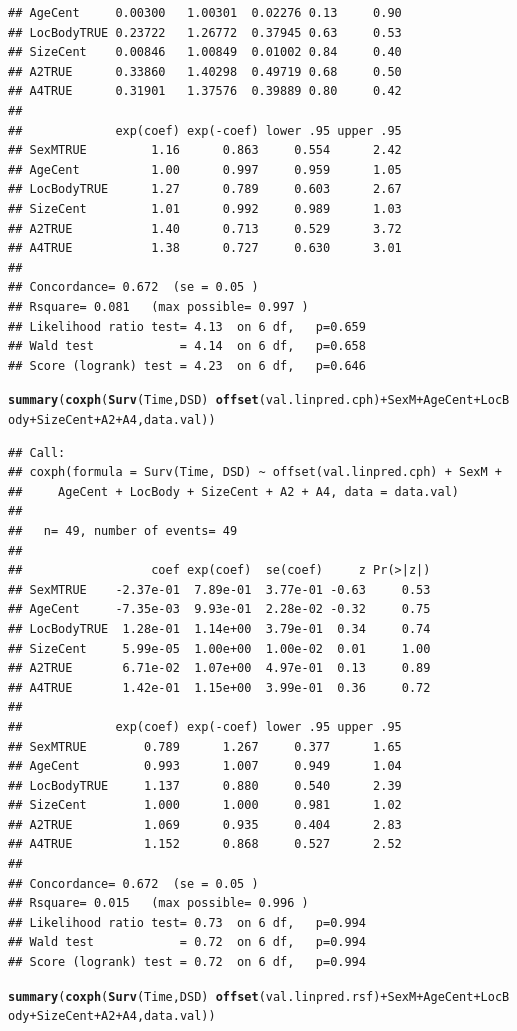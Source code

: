 \documentclass{article}\usepackage[]{graphicx}\usepackage[]{color}
\makeatletter
\newcommand{\hlopt}[1]{\textcolor[rgb]{0,0,0}{#1}}%
\newcommand{\hlstd}[1]{\textcolor[rgb]{0.345,0.345,0.345}{#1}}%
\newcommand{\hlkwd}[1]{\textcolor[rgb]{0.737,0.353,0.396}{\textbf{#1}}}%
\newenvironment{kframe}{%
 \def\at@end@of@kframe{}%
 \ifinner\ifhmode%
  \def\at@end@of@kframe{\end{minipage}}%
  \begin{minipage}{\columnwidth}%
 \fi\fi%
 \def\FrameCommand##1{\hskip\@totalleftmargin \hskip-\fboxsep
 \colorbox{shadecolor}{##1}\hskip-\fboxsep
     \hskip-\linewidth \hskip-\@totalleftmargin \hskip\columnwidth}%
 \MakeFramed {\advance\hsize-\width
   \@totalleftmargin\z@ \linewidth\hsize
   \@setminipage}}%
 {\par\unskip\endMakeFramed%
 \at@end@of@kframe}
\newenvironment{knitrout}{}{} %
\makeatother
\begin{document}
\begin{knitrout}
\begin{kframe}
\begin{verbatim}
## AgeCent     0.00300   1.00301  0.02276 0.13     0.90
## LocBodyTRUE 0.23722   1.26772  0.37945 0.63     0.53
## SizeCent    0.00846   1.00849  0.01002 0.84     0.40
## A2TRUE      0.33860   1.40298  0.49719 0.68     0.50
## A4TRUE      0.31901   1.37576  0.39889 0.80     0.42
## 
##             exp(coef) exp(-coef) lower .95 upper .95
## SexMTRUE         1.16      0.863     0.554      2.42
## AgeCent          1.00      0.997     0.959      1.05
## LocBodyTRUE      1.27      0.789     0.603      2.67
## SizeCent         1.01      0.992     0.989      1.03
## A2TRUE           1.40      0.713     0.529      3.72
## A4TRUE           1.38      0.727     0.630      3.01
## 
## Concordance= 0.672  (se = 0.05 )
## Rsquare= 0.081   (max possible= 0.997 )
## Likelihood ratio test= 4.13  on 6 df,   p=0.659
## Wald test            = 4.14  on 6 df,   p=0.658
## Score (logrank) test = 4.23  on 6 df,   p=0.646
\end{verbatim}
\begin{alltt}
\hlkwd{summary}\hlstd{(}\hlkwd{coxph}\hlstd{(}\hlkwd{Surv}\hlstd{(Time, DSD)} \hlopt{~} \hlkwd{offset}\hlstd{(val.linpred.cph)} \hlopt{+} \hlstd{SexM} \hlopt{+} \hlstd{AgeCent} \hlopt{+} \hlstd{LocBody} \hlopt{+} \hlstd{SizeCent} \hlopt{+} \hlstd{A2} \hlopt{+} \hlstd{A4, data.val))}
\end{alltt}
\begin{verbatim}
## Call:
## coxph(formula = Surv(Time, DSD) ~ offset(val.linpred.cph) + SexM + 
##     AgeCent + LocBody + SizeCent + A2 + A4, data = data.val)
## 
##   n= 49, number of events= 49 
## 
##                  coef exp(coef)  se(coef)     z Pr(>|z|)
## SexMTRUE    -2.37e-01  7.89e-01  3.77e-01 -0.63     0.53
## AgeCent     -7.35e-03  9.93e-01  2.28e-02 -0.32     0.75
## LocBodyTRUE  1.28e-01  1.14e+00  3.79e-01  0.34     0.74
## SizeCent     5.99e-05  1.00e+00  1.00e-02  0.01     1.00
## A2TRUE       6.71e-02  1.07e+00  4.97e-01  0.13     0.89
## A4TRUE       1.42e-01  1.15e+00  3.99e-01  0.36     0.72
## 
##             exp(coef) exp(-coef) lower .95 upper .95
## SexMTRUE        0.789      1.267     0.377      1.65
## AgeCent         0.993      1.007     0.949      1.04
## LocBodyTRUE     1.137      0.880     0.540      2.39
## SizeCent        1.000      1.000     0.981      1.02
## A2TRUE          1.069      0.935     0.404      2.83
## A4TRUE          1.152      0.868     0.527      2.52
## 
## Concordance= 0.672  (se = 0.05 )
## Rsquare= 0.015   (max possible= 0.996 )
## Likelihood ratio test= 0.73  on 6 df,   p=0.994
## Wald test            = 0.72  on 6 df,   p=0.994
## Score (logrank) test = 0.72  on 6 df,   p=0.994
\end{verbatim}
\begin{alltt}
\hlkwd{summary}\hlstd{(}\hlkwd{coxph}\hlstd{(}\hlkwd{Surv}\hlstd{(Time, DSD)} \hlopt{~} \hlkwd{offset}\hlstd{(val.linpred.rsf)} \hlopt{+} \hlstd{SexM} \hlopt{+} \hlstd{AgeCent} \hlopt{+} \hlstd{LocBody} \hlopt{+} \hlstd{SizeCent} \hlopt{+} \hlstd{A2} \hlopt{+} \hlstd{A4, data.val))}
\end{alltt}



\end{kframe}
\end{knitrout}
\end{document}
